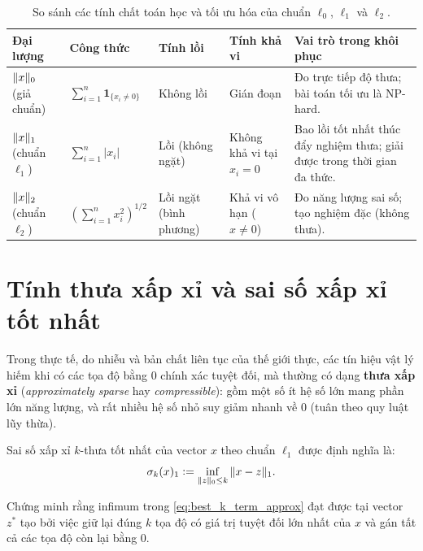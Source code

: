 \begin{table}[htbp]
\centering
\small
\caption{So sánh các tính chất toán học và tối ưu hóa của chuẩn $\ell_0$, $\ell_1$ và $\ell_2$.}
\label{tab:norm_comparison}
\begin{tabular}{p{2.0cm}p{2.4cm}p{2.2cm}p{2.6cm}p{4.1cm}}
\toprule
\textbf{Đại lượng} & \textbf{Công thức} & \textbf{Tính lồi} & \textbf{Tính khả vi} & \textbf{Vai trò trong khôi phục} \\
\midrule
$\|x\|_0$ (giả chuẩn) & $\sum_{i=1}^n \mathbf{1}_{\{x_i \ne 0\}}$ & Không lồi & Gián đoạn & Đo trực tiếp độ thưa; bài toán tối ưu là NP-hard. \\[0.15cm]
$\|x\|_1$ (chuẩn $\ell_1$) & $\sum_{i=1}^n |x_i|$ & Lồi (không ngặt) & Không khả vi tại $x_i = 0$ & Bao lồi tốt nhất thúc đẩy nghiệm thưa; giải được trong thời gian đa thức. \\[0.15cm]
$\|x\|_2$ (chuẩn $\ell_2$) & $\left(\sum_{i=1}^n x_i^2\right)^{1/2}$ & Lồi ngặt (bình phương) & Khả vi vô hạn ($x \ne 0$) & Đo năng lượng sai số; tạo nghiệm đặc (không thưa). \\
\bottomrule
\end{tabular}
\end{table}

\section{Tính thưa xấp xỉ và sai số xấp xỉ tốt nhất}
Trong thực tế, do nhiễu và bản chất liên tục của thế giới thực, các tín hiệu vật lý hiếm khi có các tọa độ bằng 0 chính xác tuyệt đối, mà thường có dạng \textbf{thưa xấp xỉ} (\emph{approximately sparse} hay \emph{compressible}): gồm một số ít hệ số lớn mang phần lớn năng lượng, và rất nhiều hệ số nhỏ suy giảm nhanh về 0 (tuân theo quy luật lũy thừa).

Sai số xấp xỉ $k$-thưa tốt nhất của vector $x$ theo chuẩn $\ell_1$ được định nghĩa là:
\begin{equation}
    \sigma_k(x)_1 \mathrel{\mathop:}= \inf_{\|z\|_0 \le k} \|x - z\|_1.
    \label{eq:best_k_term_approx}
\end{equation}

\begin{exercise}
Chứng minh rằng infimum trong \eqref{eq:best_k_term_approx} đạt được tại vector $z^*$ tạo bởi việc giữ lại đúng $k$ tọa độ có giá trị tuyệt đối lớn nhất của $x$ và gán tất cả các tọa độ còn lại bằng 0.
\end{exercise}

